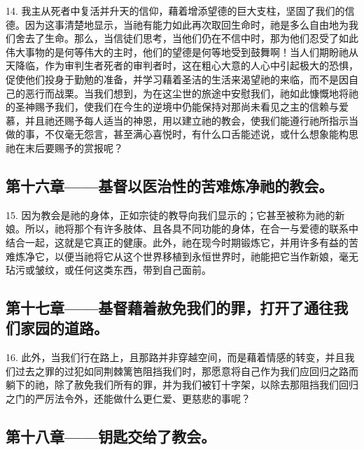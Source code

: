 14. 我主从死者中复活并升天的信仰，藉着增添望德的巨大支柱，坚固了我们的信德。因为这事清楚地显示，当祂有能力如此再次取回生命时，祂是多么自由地为我们舍去了生命。那么，当信徒们思考，当他们仍在不信中时，那为他们忍受了如此伟大事物的是何等伟大的主时，他们的望德是何等地受到鼓舞啊！当人们期盼祂从天降临，作为审判生者死者的审判者时，这在粗心大意的人心中引起极大的恐惧，促使他们投身于勤勉的准备，并学习藉着圣洁的生活来渴望祂的来临，而不是因自己的恶行而战栗。当我们想到，为在这尘世的旅途中安慰我们，祂如此慷慨地将祂的圣神赐予我们，使我们在今生的逆境中仍能保持对那尚未看见之主的信赖与爱慕，并且祂还赐予每人适当的神恩，用以建立祂的教会，使我们能遵行祂所指示当做的事，不仅毫无怨言，甚至满心喜悦时，有什么口舌能述说，或什么想象能构思祂在末后要赐予的赏报呢？\par


\subsection{第十六章——基督以医治性的苦难炼净祂的教会。}

15. 因为教会是祂的身体，正如宗徒的教导向我们显示的；它甚至被称为祂的新娘。所以，祂将那个有许多肢体、且各具不同功能的身体，在合一与爱德的联系中结合一起，这就是它真正的健康。此外，祂在现今时期锻炼它，并用许多有益的苦难炼净它，以便当祂将它从这个世界移植到永恒世界时，祂能把它当作新娘，毫无玷污或皱纹，或任何这类东西，带到自己面前。\par


\subsection{第十七章——基督藉着赦免我们的罪，打开了通往我们家园的道路。}

16. 此外，当我们行在路上，且那路并非穿越空间，而是藉着情感的转变，并且我们过去之罪的过犯如同荆棘篱笆阻挡我们时，那愿意将自己作为我们应回归之路而躺下的祂，除了赦免我们所有的罪，并为我们被钉十字架，以除去那阻挡我们回归之门的严厉法令外，还能做什么更仁爱、更慈悲的事呢？\par


\subsection{第十八章——钥匙交给了教会。}

